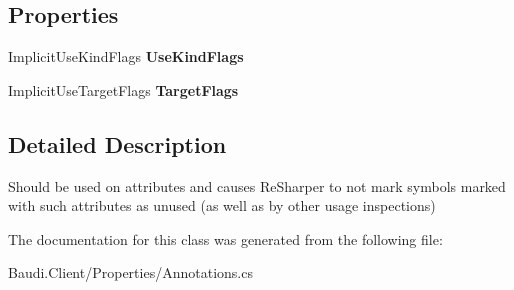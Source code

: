 \subsection*{Properties}
\begin{DoxyCompactItemize}
\item 
\hypertarget{class_means_implicit_use_attribute_af242c18a9e6e8db8d83c212231b1cd8c}{}Implicit\+Use\+Kind\+Flags {\bfseries Use\+Kind\+Flags}\label{class_means_implicit_use_attribute_af242c18a9e6e8db8d83c212231b1cd8c}

\item 
\hypertarget{class_means_implicit_use_attribute_abf0718c3b739197f26771fb693f280ac}{}Implicit\+Use\+Target\+Flags {\bfseries Target\+Flags}\label{class_means_implicit_use_attribute_abf0718c3b739197f26771fb693f280ac}

\end{DoxyCompactItemize}


\subsection{Detailed Description}
Should be used on attributes and causes Re\+Sharper to not mark symbols marked with such attributes as unused (as well as by other usage inspections) 



The documentation for this class was generated from the following file\+:\begin{DoxyCompactItemize}
\item 
Baudi.\+Client/\+Properties/Annotations.\+cs\end{DoxyCompactItemize}
